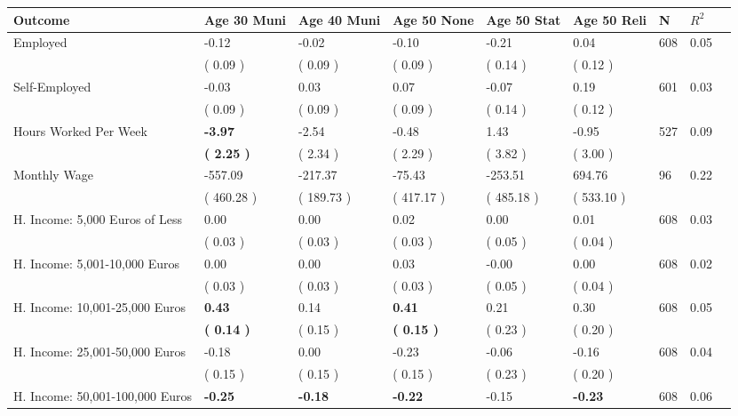 \begin{tabular}{L{6.2cm} C{1.8cm} C{1.8cm} C{1.8cm} C{1.8cm} C{1.8cm} C{1.8cm} C{0.3cm} C{0.3cm}}
\toprule
 \textbf{Outcome} & \textbf{Age 30 Muni} & \textbf{Age 40 Muni} & \textbf{Age 50 None} & \textbf{Age 50 Stat} & \textbf{Age 50 Reli} & \textbf{N} & \textbf{$ R^2$} \\
\midrule
Employed &     -0.12 &     -0.02 &     -0.10 &     -0.21 &      0.04  & 608 &       0.05 \\ 
 & (     0.09 ) & (     0.09 ) & (     0.09 ) & (     0.14 ) & (     0.12 )  & \\
Self-Employed &     -0.03 &      0.03 &      0.07 &     -0.07 &      0.19  & 601 &       0.03 \\ 
 & (     0.09 ) & (     0.09 ) & (     0.09 ) & (     0.14 ) & (     0.12 )  & \\
Hours Worked Per Week & \textbf{    -3.97} &     -2.54 &     -0.48 &      1.43 &     -0.95  & 527 &       0.09 \\ 
 & \textbf{(     2.25 )} & (     2.34 ) & (     2.29 ) & (     3.82 ) & (     3.00 )  & \\
Monthly Wage &   -557.09 &   -217.37 &    -75.43 &   -253.51 &    694.76  & 96 &       0.22 \\ 
 & (   460.28 ) & (   189.73 ) & (   417.17 ) & (   485.18 ) & (   533.10 )  & \\
H. Income: 5,000 Euros of Less &      0.00 &      0.00 &      0.02 &      0.00 &      0.01  & 608 &       0.03 \\ 
 & (     0.03 ) & (     0.03 ) & (     0.03 ) & (     0.05 ) & (     0.04 )  & \\
H. Income: 5,001-10,000 Euros &      0.00 &      0.00 &      0.03 &     -0.00 &      0.00  & 608 &       0.02 \\ 
 & (     0.03 ) & (     0.03 ) & (     0.03 ) & (     0.05 ) & (     0.04 )  & \\
H. Income: 10,001-25,000 Euros & \textbf{     0.43} &      0.14 & \textbf{     0.41} &      0.21 &      0.30  & 608 &       0.05 \\ 
 & \textbf{(     0.14 )} & (     0.15 ) & \textbf{(     0.15 )} & (     0.23 ) & (     0.20 )  & \\
H. Income: 25,001-50,000 Euros &     -0.18 &      0.00 &     -0.23 &     -0.06 &     -0.16  & 608 &       0.04 \\ 
 & (     0.15 ) & (     0.15 ) & (     0.15 ) & (     0.23 ) & (     0.20 )  & \\
H. Income: 50,001-100,000 Euros & \textbf{    -0.25} & \textbf{    -0.18} & \textbf{    -0.22} &     -0.15 & \textbf{    -0.23}  & 608 &       0.06 \\ 

\end{tabular}

